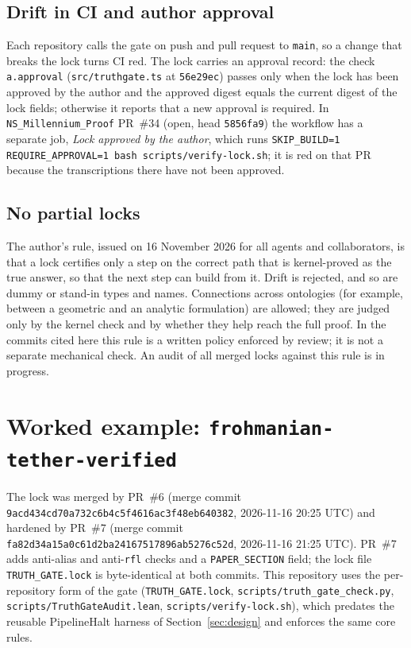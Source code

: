 \documentclass[11pt,a4paper]{article}
\newcommand{\code}[1]{\texttt{#1}}
\begin{document}
\subsection{Drift in CI and author approval}

Each repository calls the gate on push and pull request to \code{main}, so a change that breaks
the lock turns CI red. The lock carries an approval record: the check \code{a.approval}
(\code{src/truthgate.ts} at \code{56e29ec}) passes only when the lock has been approved by the
author and the approved digest equals the current digest of the lock fields; otherwise it
reports that a new approval is required. In \code{NS\_Millennium\_Proof} PR~\#34 (open, head
\code{5856fa9}) the workflow has a separate job, \emph{Lock approved by the author}, which runs
\code{SKIP\_BUILD=1 REQUIRE\_APPROVAL=1 bash scripts/verify-lock.sh}; it is red on that PR
because the transcriptions there have not been approved.

\subsection{No partial locks}

The author's rule, issued on 16 November 2026 for all agents and collaborators, is that a lock
certifies only a step on the correct path that is kernel-proved as the true answer, so that the
next step can build from it. Drift is rejected, and so are dummy or stand-in types and names.
Connections across ontologies (for example, between a geometric and an analytic formulation)
are allowed; they are judged only by the kernel check and by whether they help reach the full
proof. In the commits cited here this rule is a written policy enforced by review; it is not a
separate mechanical check. An audit of all merged locks against this rule is in progress.

\section{Worked example: \code{frohmanian-tether-verified}}
\label{sec:example}

The lock was merged by PR~\#6 (merge commit
\code{9acd434cd70a732c6b4c5f4616ac3f48eb640382}, 2026-11-16 20:25 UTC) and hardened by PR~\#7
(merge commit \code{fa82d34a15a0c61d2ba24167517896ab5276c52d}, 2026-11-16 21:25 UTC). PR~\#7
adds anti-alias and anti-\code{rfl} checks and a \code{PAPER\_SECTION} field; the lock file
\code{TRUTH\_GATE.lock} is byte-identical at both commits. This repository uses the per-repository
form of the gate (\code{TRUTH\_GATE.lock}, \code{scripts/truth\_gate\_check.py},
\code{scripts/TruthGateAudit.lean}, \code{scripts/verify-lock.sh}), which predates the reusable
PipelineHalt harness of Section~\ref{sec:design} and enforces the same core rules.
\end{document}

